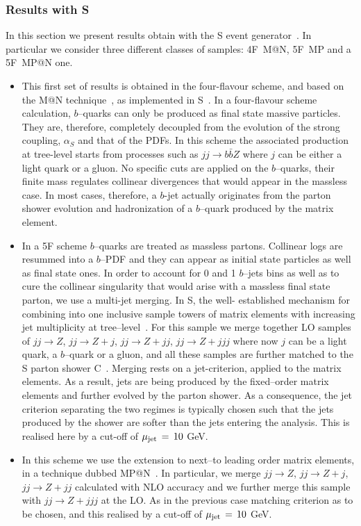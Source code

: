 \documentclass[11pt]{cernrep} \usepackage{graphicx,epsfig} 
\makeatletter
\newcommand{\Sherpa}{S\protect\scalebox{0.8}{HERPA}\xspace}
\newcommand{\CSS}{C\protect\scalebox{0.8}{SS}\xspace}
\newcommand{\MCatNLO}{M\protect\scalebox{0.8}{C}@N\protect\scalebox{0.8}{LO}\xspace}
\newcommand{\MEPS}{M\scalebox{0.8}{E}P\scalebox{0.8}{S}\xspace}
\newcommand{\MEPSatNLO}{M\scalebox{0.8}{E}P\scalebox{0.8}{S}@N\protect\scalebox{0.8}{LO}\xspace}
\makeatother
\begin{document}
\subsubsection{Results with \protect\Sherpa }
In this section we present results obtain with the \Sherpa event generator~\cite{Gleisberg:2008ta}. In particular we consider three different classes of samples: 4F~\MCatNLO, 5F~\MEPS and a 5F~\MEPSatNLO one.
\begin{itemize}
\item[4F \MCatNLO : ]{
	This first set of results is obtained in the four-flavour scheme, and based
	on the \MCatNLO technique~\cite{Frixione:2002ik}, as implemented in
  	\Sherpa~\cite{Hoeche:2011fd}. In a four-flavour scheme calculation, $b$--quarks
	can only be produced as final state massive particles. They are, therefore, 
	completely decoupled from the evolution of the strong coupling, $\alpha_S$
	and that of the PDFs. In this scheme the associated production at tree-level
	starts from processes such as $jj \to b\bar{b}Z$ where $j$ can be either a light
	quark or a gluon. No specific cuts are applied on the $b$--quarks, their finite
 	mass regulates collinear divergences that would appear in
  	the massless case. In most cases, therefore, a $b$-jet actually
 	originates from the parton shower evolution and hadronization of a
  	$b$--quark produced by the matrix element.}
\item[5F~\MEPS :]{
	In a 5F scheme $b$--quarks are treated as massless partons. Collinear 
	logs are resummed into a $b$--PDF and they can appear as initial state 
	particles as well as final state ones. In order to account for 0 and 1 $b$--jets
	bins as well as to cure the collinear singularity that would arise with a 
	massless final state parton, we use a multi-jet merging. In \Sherpa, the well-			established mechanism for  combining into one inclusive sample towers of 
	matrix elements with increasing jet multiplicity at tree--\-level~\cite{Catani:2001cc}.
	For this sample we merge together LO samples of $jj \to Z$, $jj \to Z+j$,
	$jj \to Z+jj$,  $jj \to Z+jjj$ where now $j$ can be a light quark, a $b$--quark or a  		gluon, and all these samples are further matched to the \Sherpa 
	parton shower \CSS~\cite{Schumann:2007mg}. 
	Merging rests on a jet-criterion, applied to the matrix
  	elements.  As a result, jets are being produced by the fixed--order
  	matrix elements and further evolved by the parton shower.  As a consequence,
  	the jet criterion separating the two regimes is typically chosen such
  	that the jets produced by the shower are softer than the jets
  	entering the analysis.  This is realised here by a cut-off of
  	$\mu_{\rm jet}\,=\, 10 $ GeV.}
	
\item[5F~\MEPSatNLO : ]{
	In this scheme we use the extension to next--to leading order matrix elements, in
  	a technique dubbed \MEPSatNLO~\cite{Hoeche:2012yf}.
	In particular, we merge $jj \to Z$, $jj \to Z+j$, $jj \to Z+jj$ calculated with NLO
	accuracy and we further merge this sample with $jj \to Z+jjj$ at the LO.
	As in the previous case matching criterion as to be chosen, and this
	realised by a cut-off of  $\mu_{\rm jet}\,=\, 10 $ GeV.}
\end{itemize}
\end{document}
